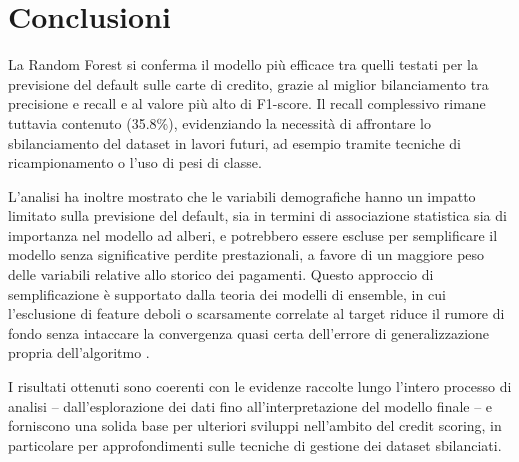 \documentclass[11pt,a4paper]{article}
\begin{document}
\newpage
\section{Conclusioni}
\label{sec:conclusioni}

La Random Forest si conferma il modello più efficace tra quelli testati per la previsione del default sulle carte di credito, grazie al miglior bilanciamento tra precisione e recall e al valore più alto di F1-score. Il recall complessivo rimane tuttavia contenuto (35.8\%), evidenziando la necessità di affrontare lo sbilanciamento del dataset in lavori futuri, ad esempio tramite tecniche di ricampionamento o l'uso di pesi di classe.

L'analisi ha inoltre mostrato che le variabili demografiche hanno un impatto limitato sulla previsione del default, sia in termini di associazione statistica sia di importanza nel modello ad alberi, e potrebbero essere escluse per semplificare il modello senza significative perdite prestazionali, a favore di un maggiore peso delle variabili relative allo storico dei pagamenti. Questo approccio di semplificazione è supportato dalla teoria dei modelli di ensemble, in cui l'esclusione di feature deboli o scarsamente correlate al target riduce il rumore di fondo senza intaccare la convergenza quasi certa dell'errore di generalizzazione propria dell'algoritmo \cite{breiman2001}.

I risultati ottenuti sono coerenti con le evidenze raccolte lungo l'intero processo di analisi -- dall'esplorazione dei dati fino all'interpretazione del modello finale -- e forniscono una solida base per ulteriori sviluppi nell'ambito del credit scoring, in particolare per approfondimenti sulle tecniche di gestione dei dataset sbilanciati.

\newpage



\end{document}
